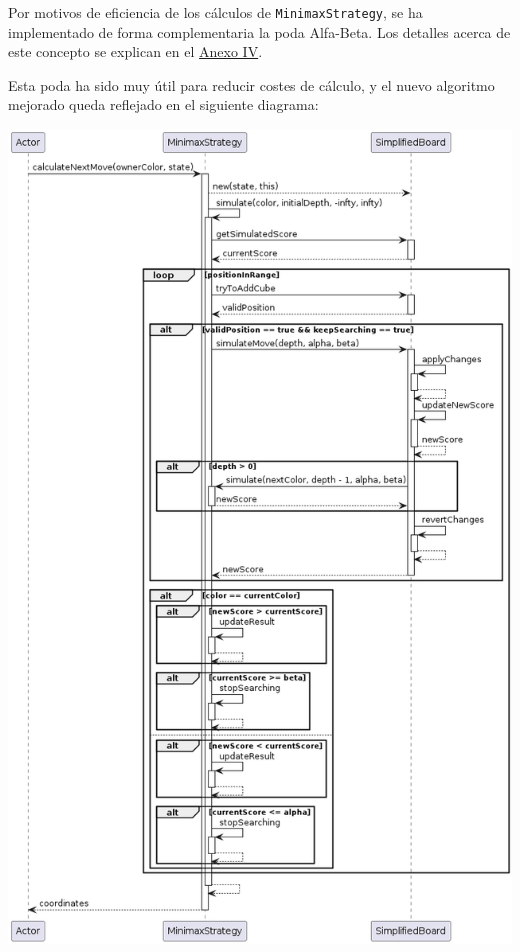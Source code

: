 \documentclass[../DocumentoOficial.tex]{subfiles}
\begin{document}
\begin{sprint}[6]
Por motivos de eficiencia de los cálculos de \texttt{MinimaxStrategy}, se ha implementado de forma complementaria la poda Alfa-Beta. Los detalles acerca de este concepto se explican en el \hyperref[ch:AnexoIV]{Anexo IV}.

Esta poda ha sido muy útil para reducir costes de cálculo, y el nuevo algoritmo mejorado queda reflejado en el siguiente diagrama:

\begin{center}
\centering
\includegraphics[scale=0.5]{MinimaxStrategy.calculateNextMove()-sprint6.png}
\end{center}

\end{sprint}
\end{document}

